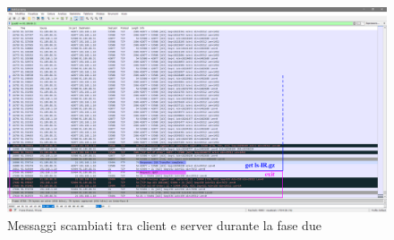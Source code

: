 \documentclass[a4paper, 12pt]{report}
\begin{document}
\begin{figure}[H]
	\centering
	\includegraphics[width=\linewidth]{images/image2_3.png}
	\caption{Messaggi scambiati tra client e server durante la fase due}
\end{figure}
\end{document}
